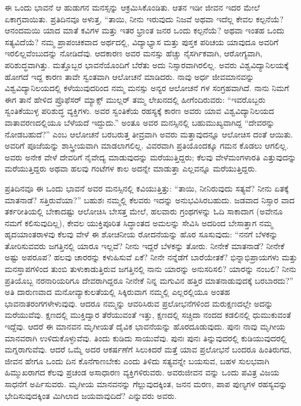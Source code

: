 ಈ ಒಂದು ಭಾವನೆ ಆ ಹುಡುಗನ ಮನಸ್ಸನ್ನು ಆಕ್ರಮಿಸಿಕೊಂಡಿತು. ಆತನ ಇಡೀ ಜೀವನ ಇದರ ಮೇಲೆ ಏಕಾಗ್ರವಾಯಿತು. ಪ್ರತಿದಿನವೂ ಅಳುತ್ತ, “ತಾಯಿ, ನೀನು ಇರುವುದು ನಿಜವೆ ಅಥವಾ ಇದೆಲ್ಲ ಕೇವಲ ಕಲ್ಪನೆಯೆ? ಆನಂದಮಯಿ ಯಾದ ಮಾತೆ ಕವಿಗಳ ಮತ್ತು ಇತರ ಭ್ರಾಂತ ಜನರ ಒಂದು ಕಲ್ಪನೆಯೆ? ಅಥವಾ ಇಂತಹ ಒಂದು ಸತ್ಯವಿದೆಯೆ? ನಮ್ಮ ಪ್ರಾಪಂಚಿಕವಾದ ಅರ್ಥದಲ್ಲಿ, ವಿದ್ಯಾಭ್ಯಾಸ ಮತ್ತು ಪುಸ್ತಕ ಪರಿಚಯ ಯಾವುದೂ ಅವರಿಗೆ ಇರಲಿಲ್ಲವೆಂಬುದನ್ನು ನೋಡಿದೆವು. ಆದಕಾರಣ ಅವರ ಮನಸ್ಸು ಹೆಚ್ಚು ನೈಸರ್ಗಿಕವಾಗಿ, ಆರೋಗ್ಯವಾಗಿ, ಪರಿಶುದ್ಧವಾಗಿತ್ತು. ಮತ್ತೊಬ್ಬರ ಭಾವನೆಯೊಂದಿಗೆ ಬೆರೆತು ಅದು ನಿಸ್ಸಾರವಾಗಿರಲಿಲ್ಲ. ಅವರು ವಿಶ್ವವಿದ್ಯಾನಿಲಯಕ್ಕೆ ಹೋಗದೆ ಇದ್ದ ಕಾರಣ ತಾವೇ ಸ್ವಂತವಾಗಿ ಆಲೋಚನೆ ಮಾಡಿದರು. ನಾವು ಅರ್ಧ ಜೀವಮಾನವನ್ನು ವಿಶ್ವವಿದ್ಯಾನಿಲಯದಲ್ಲಿ ಕಳೆಯುವುದರಿಂದ ನಮ್ಮ ಮನಸ್ಸು ಅನ್ಯರ ಆಲೋಚನೆ ಗಳ ಸಂಗ್ರಹವಾಗಿದೆ. ನಾನು ನಿಮಗೆ ಈಗ ತಾನೆ ಹೇಳಿದ ಪ್ರೊಫೆಸರ್​ ಮ್ಯಾಕ್ಸ್ ಮುಲ್ಲರ್​ ತಮ್ಮ ಲೇಖನದಲ್ಲಿ ಹೀಗೆಂದಿರುವರು: “ಇವರೊಬ್ಬರು ಸ್ವಂತಿಕೆಯುಳ್ಳ ಪರಿಶುದ್ಧ ವ್ಯಕ್ತಿಗಳು. ಅವರ ಸ್ವಂತಿಕೆಯ ರಹಸ್ಯಕ್ಕೆ ಕಾರಣ ಅವರು ಯಾವ ವಿಶ್ವವಿದ್ಯಾನಿಲಯದ ವಾತಾವರಣದಲ್ಲಿಯೂ ಬೆಳೆಯದೆ ಇದ್ದುದು.” ಅಂತೂ ಅವರ ಮನಸ್ಸಿನಲ್ಲಿ ಬಹುಮುಖ್ಯವಾಗಿದ್ದ “ದೇವರನ್ನು ನೋಡಬಹುದೆ?” ಎಂಬ ಆಲೋಚನೆ ಬರಬರುತ್ತ ತೀವ್ರವಾಗಿ ಅವರು ಮತ್ತಾವುದನ್ನೂ ಆಲೋಚಿಸ ದಂತೆ ಆಯಿತು. ಅವರಿಗೆ ಪೂಜೆಯನ್ನು ಶಾಸ್ತ್ರೀಯವಾಗಿ ಮಾಡಲಾಗಲಿಲ್ಲ. ವಿವರವಾಗಿ ಪ್ರತಿಯೊಂದಕ್ಕೂ ಗಮನ ಕೊಡಲು ಆಗಲಿಲ್ಲ. ಅವರು ಅನೇಕ ವೇಳೆ ದೇವರಿಗೆ ನೈವೇದ್ಯ ಮಾಡುವುದನ್ನು ಮರೆಯುತ್ತಿದ್ದರು; ಕೆಲವು ವೇಳೆಮಂಗಳಾರತಿ ಎತ್ತುವುದನ್ನು ಮರೆಯುತ್ತಿದ್ದರು ಅಥವಾ ಹಲವು ಗಂಟೆಗಳ ಕಾಲ ಅದನ್ನೇ ಮಾಡುತ್ತಾ ಎಲ್ಲವನ್ನೂ ಮರೆಯುತ್ತಿದ್ದರು.

ಪ್ರತಿದಿನವೂ ಈ ಒಂದು ಭಾವನೆ ಅವರ ಮನಸ್ಸಿನಲ್ಲಿ ಕವಿಯುತ್ತಿತ್ತು: “ತಾಯಿ, ನೀನಿರುವುದು ಸತ್ಯವೆ? ನೀನು ಏತಕ್ಕೆ ಮಾತನಾಡೆ? ಸತ್ತಿರುವೆಯಾ?” ಬಹುಶಃ ನಮ್ಮಲ್ಲಿ ಕೆಲವರು ಇದನ್ನು ಅನುಭವಿಸಿರಬಹುದು. ಜಡವಾದ ನಿಸ್ಸಾರ ವಾದ ತರ್ಕರೀತಿಯಲ್ಲಿ ಬೇಕಾದಷ್ಟು ಆಲೋಚಿಸಿ ಬೇಸತ್ತ ಮೇಲೆ, ಹಲವಾರು ಗ್ರಂಥಗಳನ್ನು ಓದಿ ಸಾಕಾದಾಗ (ಅವೇನೂ ನಮಗೆ ಕಲಿಸುವುದಿಲ್ಲ), ಕೇವಲ ಯುಕ್ತಿಪೂರಿತ ಸಿದ್ಧಾಂತದ ಅಮಲನ್ನು ಸೇವಿಸಿ ಅದರಿಂದ ಬೇಸಾತ್ತಾಗ ನಮ್ಮ ಹೃದಯಾಂತರಾಳವು ಕೆಲವು ವೇಳೆ ಈ ಶೋಚನೀಯ ರೋದನೆಯನ್ನು ಹೊರ ಸೂಸುವುದು: “ನನಗೆ ಬೆಳಕನ್ನು ತೋರಿಸುವವರು ಜಗತ್ತಿನಲ್ಲಿ ಯಾರೂ ಇಲ್ಲವೆ? ನೀನು ಇದ್ದರೆ ಬೆಳಕನ್ನು ತೋರು. ನೀನೇಕೆ ಮಾತನಾಡೆ? ನೀನೇಕೆ ಅಷ್ಟು ಅಪರೂಪ? ಹಲವು ಚಾರರನ್ನು ಕಳುಹಿಸುವೆ ಏಕೆ? ನೀನೇ ನನ್ನೆಡೆಗೆ ಬಾರೆಯೇತಕೆ? ಭಿನ್ನಾಭಿಪ್ರಾಯಗಳು ಮತ್ತು ಮನಸ್ತಾಪಗಳಿಂದ ತುಂಬಿ ತುಳುಕಾಡುತ್ತಿರುವ ಜಗತ್ತಿನಲ್ಲಿ ನಾನು ಯಾರನ್ನು ಅನುಸರಿಸಲಿ? ಯಾರನ್ನು ನಂಬಲಿ? ನೀನು ಪ್ರತಿಯೊಬ್ಬ ನರನಾರಿಯರಿಗೂ ದೇವರಾಗಿದ್ದರೂ ನೀನೇಕೆ ನಿನ್ನ ಮಗುವಿನ ಹತ್ತಿರ ಮಾತನಾಡುವುದಕ್ಕೆ ಬರಬಾರದು?” ಅತಿ ದಾರುಣವಾದ ಮನೋವ್ಯಾಕುಲತೆಯಲ್ಲಿ ಸಿಕ್ಕಿರುವಾಗ ನಮ್ಮಲ್ಲಿ ಎಲ್ಲರಲ್ಲಿಯೂ ಅಂತಹ ಭಾವನಾತರಂಗಗಳೇಳುವುವು. ಆದರೂ ನಮ್ಮನ್ನು ಆವರಿಸಿರುವ ಪ್ರಲೋಭನೆಗಳಿಂದ ಮರುಕ್ಷಣದಲ್ಲೇ ಅದನ್ನು ಮರೆಯುವೆವು. ಕ್ಷಣದಲ್ಲಿ ಮುಕ್ತಿದ್ವಾರ ತೆರೆಯುವಂತೆ ಇತ್ತು, ಕ್ಷಣದಲ್ಲಿ ಸಚ್ಚಿದಾ ನಂದದ ಕಡಲಿನಲ್ಲಿ ಧುಮುಕುವಂತೆ ಇದ್ದೆವು. ಆದರೆ ಈ ಮಾನವನ ಮೃಗೀಯತೆ ದೈವಿಕ ಭಾವನೆಯನ್ನು ಹೊರದೂಡುವುದು. ಪುನಃ ನಾವು ಮೃಗೀಯ ಮಾನವರಾಗಿ ಉಳಿದುಕೊಳ್ಳುವೆವು. ತಿಂದು ಕುಡಿದು ಸಾಯುವೆವು. ಪುನಃ ಪುನಃ ತಿನ್ನುವುದರಲ್ಲಿ ಕುಡಿಯುವುದರಲ್ಲಿ ಮಗ್ನರಾಗುವೆವು. ಆದರೆ ಒಮ್ಮೆ ಅದರ ಆಕರ್ಷಣೆಗೆ ಸಿಲುಕಿದರೆ ಮತ್ತೆ ಯಾವ ಪ್ರಲೋಭನೆ ಬಂದರೂ ಹಿಂತಿರುಗದ, ಜೀವನ ಹೇಗೂ ಒಂದು ದಿನ ಕೊನೆಗಾಣಬೇಕು ಎಂದು ತಿಳಿದು ಸತ್ಯವನ್ನೇ ಬಯಸುವ, ಬಹಳ ಸುಲಭವಾಗಿ ಹಿಮ್ಮುಖರಾಗದ ಕೆಲವು ಪ್ರಚಂಡ ಅಸಾಧಾರಣ ವ್ಯಕ್ತಿಗಳಿರುವರು. ಅವರುಜೀವನ ವನ್ನು ಒಂದು ಪವಿತ್ರ ವಿಜಯ ಸಾಧನೆಗೆ ಅರ್ಪಿಸುವರು. ಮೃಗೀಯ ಮಾನವನನ್ನು ಗೆಲ್ಲುವುದಕ್ಕಿಂತ, ಜನನ ಮರಣ, ಪಾಪ ಪುಣ್ಯಗಳ ರಹಸ್ಯವನ್ನು ಭೇದಿಸುವುದಕ್ಕಿಂತ ಮಿಗಿಲಾದ ಜಯವಾವುದಿದೆ? ಎನ್ನುವರು ಅವರು.

